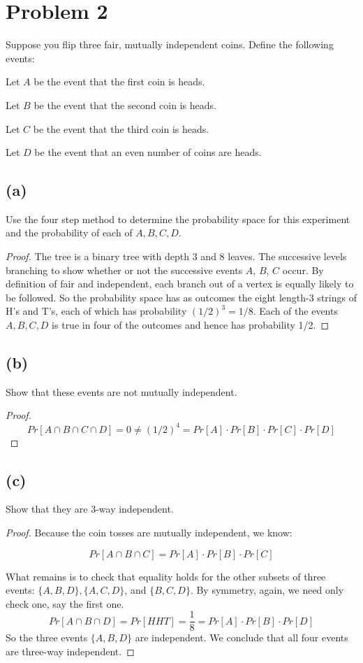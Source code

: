 \documentclass[14pt]{extarticle}
\begin{document}
\section{Problem 2}
Suppose you flip three fair, mutually independent coins. Define the following events:

Let $A$ be the event that the first coin is heads.

Let $B$ be the event that the second coin is heads.

Let $C$ be the event that the third coin is heads.

Let $D$ be the event that an even number of coins are heads.

\subsection{(a)}
Use the four step method to determine the probability space for this experiment and the probability of each of $A, B, C, D$.

\begin{proof}
The tree is a binary tree with depth 3 and 8 leaves. The successive levels branching to show whether or not the successive events $A$, $B$, $C$ occur. By definition of fair and independent, each branch out of a vertex is equally likely to be followed. So the probability space has as outcomes the eight length-3 strings of H’s and T’s, each of which has probability $(1/2)^3 = 1/8$. Each of the events $A, B, C, D$ is true in four of the outcomes and hence has probability 1/2.
\end{proof}

\subsection{(b)}
Show that these events are not mutually independent.
\begin{proof}
$$
Pr[A\cap B\cap C\cap D] = 0 \neq (1/2)^4 = Pr[A]\cdot Pr[B]\cdot Pr[C]\cdot Pr[D]
$$
\end{proof}

\subsection{(c)}
Show that they are 3-way independent.

\begin{proof}
Because the coin tosses are mutually independent, we know:

$$
Pr[A\cap B\cap C] = Pr[A]\cdot Pr[B]\cdot Pr[C]
$$

What remains is to check that equality holds for the other subsets of three events: $\{A, B, D\}, \{A, C, D\}$, and $\{B, C, D\}$. By symmetry, again, we need only check one, say the first one.
$$
Pr[A \cap B \cap D] = Pr[HHT] = \frac{1}{8} = Pr[A]\cdot Pr[B]\cdot Pr[D]
$$
So the three events $\{A, B, D\}$ are independent. We conclude that all four events are three-way independent.
\end{proof}
\end{document}
